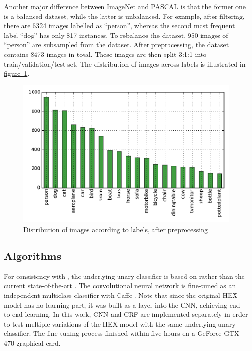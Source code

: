 \documentclass[11pt,a4paper]{article}
\begin{document}
Another major difference between ImageNet and PASCAL is that the former one is a balanced dataset, while the latter is unbalanced. For example, after filtering, there are 5324 images labelled as ``person'', whereas the second most frequent label ``dog'' has only 817 instances. To rebalance the dataset, 950 images of ``person'' are subsampled from the dataset.  After preprocessing, the dataset contains 8473 images in total. These images are then split 3:1:1 into train/validation/test set. The distribution of images across labels is illustrated in \hyperref[fig:distro]{figure~\ref{fig:distro}}.
\begin{figure}[htbp]
\centering
\includegraphics[scale=0.8]{distro.pdf}
\caption{Distribution of images according to labels, after preprocessing}
\label{fig:distro}
\end{figure}

\subsection{Algorithms}

For consistency with \cite{deng2014large}, the underlying unary classifier is based on \cite{krizhevsky2012imagenet} rather than the current state-of-the-art \cite{simonyan2014very}. The convolutional neural network is fine-tuned as an independent multiclass classifier with Caffe \cite{jia2014caffe}. Note that since the original HEX model has no learning part, it was built as a layer into the CNN, achieving end-to-end learning. In this work, CNN and CRF are implemented separately in order to test multiple variations of the HEX model with the same underlying unary classifier. The fine-tuning process finished within five hours on a GeForce GTX 470 graphical card.
\end{document}
